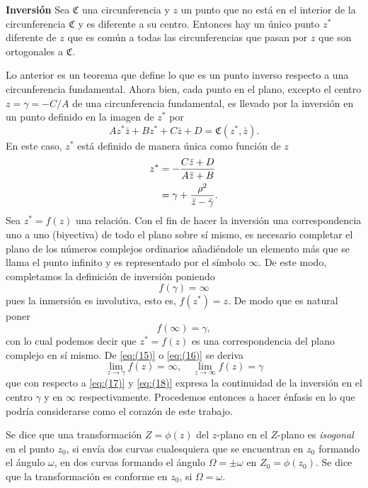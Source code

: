 \documentclass{matematicasud}
\begin{document}
\textbf{Inversión} Sea $\mathfrak{C}$ una circunferencia y $z$ un punto que no está en el interior de la circunferencia $\mathfrak{C}$ y es diferente a su centro. Entonces hay un único punto $z^*$ diferente de $z$ que es común a todas las circunferencias que pasan por $z$ que son ortogonales a $\mathfrak{C}$.

Lo anterior es un teorema que define lo que es un punto inverso respecto a una circunferencia fundamental. Ahora bien, cada punto en el plano, excepto el centro $z=\gamma=-C/A$ de una circunferencia fundamental, es llevado por la inversión en un punto definido en la imagen de $z^*$ por
\begin{equation}
    Az^*\bar{z}+Bz^*+C\bar{z}+D=\mathfrak{C}(z^*,\bar{z}).
    \label{eq:(15)}
\end{equation}
En este caso, $z^*$ está definido de manera única como función de $z$
\begin{align}
    z^*&=-\frac{C\bar{z}+D}{A\bar{z}+B}\notag\\
    &=\gamma+\frac{\rho^2}{\bar{z}-\bar{\gamma}}.
    \label{eq:(16)}
\end{align}
Sea $z^*=f(z)$ una relación. Con el fin de hacer la inversión una correspondencia uno a uno (biyectiva) de todo el plano sobre sí mismo, es necesario completar el plano de los números complejos ordinarios añadiéndole un elemento más que se llama el punto infinito y es representado por el símbolo $\infty$.
De este modo, completamos la definición de inversión poniendo
\begin{equation}
    f(\gamma)=\infty
    \label{eq:(17)}
\end{equation}
pues la inmersión es involutiva, esto es, $f(z^*)=z$. De modo que es natural poner
\begin{equation}
    f(\infty)=\gamma,
    \label{eq:(18)}
\end{equation}
con lo cual podemos decir que $z^*=f(z)$ es una correspondencia del plano complejo en sí mismo. De \eqref{eq:(15)} o \eqref{eq:(16)} se deriva
\begin{equation*}
    \lim_{z \rightarrow \gamma}f(z)=\infty, \quad \lim_{z \rightarrow \infty}f(z)=\gamma
\end{equation*}
que con respecto a \eqref{eq:(17)} y \eqref{eq:(18)} expresa la continuidad de la inversión en el centro $\gamma$ y en $\infty$ respectivamente. Procedemos entonces a hacer énfasis en lo que podría considerarse como el corazón de este trabajo.

Se dice que una transformación $Z=\phi(z)$ del $z$-plano en el $Z$-plano es \textit{isogonal} en el punto $z_0$, si envía dos curvas cualesquiera que se encuentran en $z_0$ formando el ángulo $\omega$, en dos curvas formando el ángulo $\Omega=\pm\omega$ en $Z_0=\phi(z_0)$. Se dice que la transformación es conforme en $z_0$, si $\Omega=\omega$.
\end{document}
